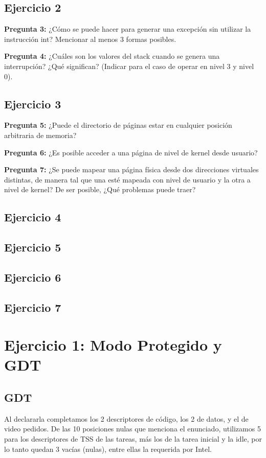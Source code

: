 \documentclass[10pt, a4paper]{article}
\begin{document}
\subsection{Ejercicio 2}
{\textbf{Pregunta 3:}} ¿Cómo se puede hacer para generar una excepción sin utilizar la instrucción int? Mencionar al menos 3 formas posibles.\newline

{\textbf{Pregunta 4:}} ¿Cuáles son los valores del stack cuando se genera una interrupción? ¿Qué significan? (Indicar para el caso de operar en nivel 3 y nivel 0).\newline


\subsection{Ejercicio 3}
{\textbf{Pregunta 5:}} ¿Puede el directorio de páginas estar en cualquier posición arbitraria de memoria?\newline

{\textbf{Pregunta 6:}} ¿Es posible acceder a una página de nivel de kernel desde usuario?\newline

{\textbf{Pregunta 7:}} ¿Se puede mapear una página física desde dos direcciones virtuales
distintas, de manera tal que una esté mapeada con nivel de usuario y la otra a nivel de kernel? De ser posible, ¿Qué problemas puede traer?\newline

\subsection{Ejercicio 4}
\subsection{Ejercicio 5}
\subsection{Ejercicio 6}
\subsection{Ejercicio 7}


\section{Ejercicio 1: Modo Protegido y GDT}
\subsection{GDT}
Al declararla completamos los 2 descriptores de código, los 2 de datos, y el de video pedidos. De las 10 posiciones nulas que menciona el enunciado, utilizamos 5 para los descriptores de TSS de las tareas, más los de la tarea inicial y la idle, por lo tanto quedan 3 vacías (nulas), entre ellas la requerida por Intel.
\end{document}
